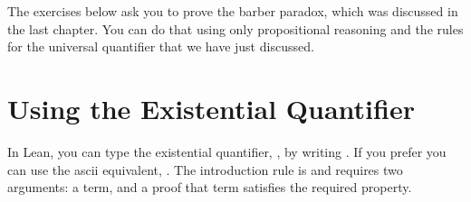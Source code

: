 \documentclass[letterpaper,10pt,english]{sphinxmanual}
\begin{document}
\begin{sphinxVerbatim}[commandchars=\\\{\}]
                   
       
         
      
            
            
                 
\end{sphinxVerbatim}

\sphinxAtStartPar
The exercises below ask you to prove the barber paradox, which was discussed in the last chapter. You can do that using only propositional reasoning and the rules for the universal quantifier that we have just discussed.


\section{Using the Existential Quantifier}
\label{\detokenize{first_order_logic_in_lean:using-the-existential-quantifier}}
\sphinxAtStartPar
In Lean, you can type the existential quantifier, , by writing .
If you prefer you can use the ascii equivalent, .
The introduction rule is  and requires two arguments:
a term, and a proof that term satisfies the required property.

\begin{sphinxVerbatim}[commandchars=\\\{\}]
   
     

             
  
\end{sphinxVerbatim}
\end{document}
